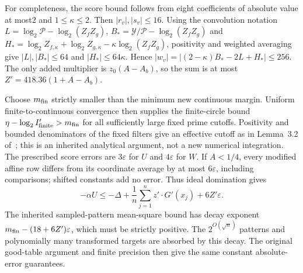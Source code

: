\documentclass[11pt]{article}
\theoremstyle{remark}\newtheorem*{remark}{Scope}
\newcommand{\eps}{\varepsilon}
\begin{document}
For completeness, the score bound follows from eight coefficients of
absolute value at most2 and $1\le\kappa\le2$. Then $|r_v|,|s_v|\le16$.
Using the convolution notation $L=\log_2\mathcal P-\log_2(Z_fZ_g)$,
$B_*=\mathcal Y/\mathcal P-\log_2(Z_fZ_g)$ and
$H_*=\log_2Z_{f,\kappa}+\log_2Z_{g,\kappa}-\kappa\log_2(Z_fZ_g)$,
positivity and weighted averaging give $|L|,|B_*|\le64$ and
$|H_*|\le64\kappa$. Hence
$|w_v|=|(2-\kappa)B_*-2L+H_*|\le256$.
The only added multiplier is $z_0(A-A_b)$, so the sum is at most
$Z'=418.36(1+A-A_b)$.

Choose $m_{\rm fin}$ strictly smaller than the minimum new continuous
margin. Uniform finite-to-continuous convergence then supplies the
finite-circle bound $\eta-\log_2 I'_{\rm finite}>m_{\rm fin}$ for all
sufficiently large fixed prime cutoffs. Positivity and bounded denominators
of the fixed filters give an effective cutoff as in Lemma~3.2
of~\cite{openai}; this is an inherited analytical argument, not a new
numerical integration.
The prescribed score errors are $3\eps$ for $U$ and $4\eps$ for $W$.
If $A<1/4$, every modified affine row differs from its coordinate average
by at most $6\eps$, including comparisons; shifted constants add no error.
Thus ideal domination gives
\[
 -\alpha U\le-\Delta+\frac1n\sum_{j=1}^n z'\cdot G'(x_j)+6Z'\eps.
\]
The inherited sampled-pattern mean-square bound has decay exponent
$m_{\rm fin}-(18+6Z')\eps$, which must be strictly positive.
The $2^{O(\sqrt n)}$ patterns and polynomially many transformed targets
are absorbed by this decay. The original good-table argument and finite
precision then give the same constant absolute-error guarantees.
\end{document}
